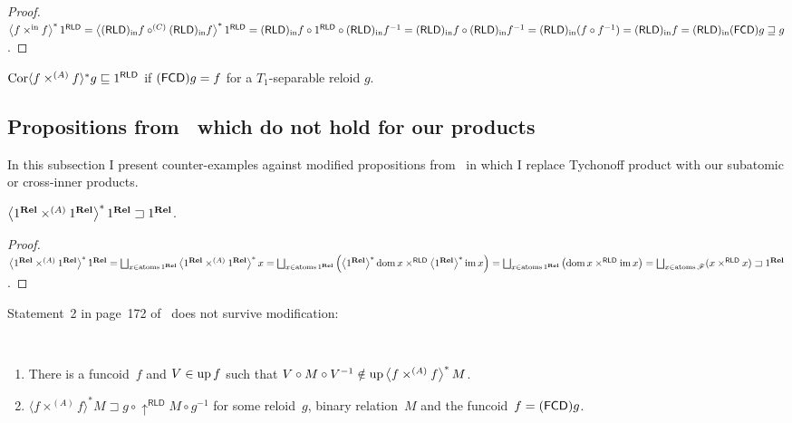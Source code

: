 \begin{proof}
$\left\langle f \times^{\mathrm{in}} f\right\rangle ^{\ast} 1^{\mathsf{RLD}} =
\left\langle (\mathsf{RLD})_{\mathrm{in}} f\circ^{(C)}(\mathsf{RLD})_{\mathrm{in}} f\right\rangle ^{\ast} 1^{\mathsf{RLD}} =
(\mathsf{RLD})_{\mathrm{in}} f\circ 1^{\mathsf{RLD}} \circ (\mathsf{RLD})_{\mathrm{in}} f^{-1} = 
(\mathsf{RLD})_{\mathrm{in}} f\circ (\mathsf{RLD})_{\mathrm{in}} f^{-1} = 
(\mathsf{RLD})_{\mathrm{in}} (f\circ f^{-1}) = (\mathsf{RLD})_{\mathrm{in}} f = (\mathsf{RLD})_{\mathrm{in}}(\mathsf{FCD}) g \sqsupseteq g$.
\end{proof}

\begin{lem}
  $\operatorname{Cor} \langle f \times^{(A)} f \rangle^{\ast} g \sqsubseteq 1^{\mathsf{RLD}}$ if
  $(\mathsf{FCD}) g = f$ for a $T_1$-separable reloid $g$.
\end{lem}

\subsection{Propositions from~\cite{bourb-top-1} which do not hold for our products}

In this subsection I present counter-examples against modified propositions from~\cite{bourb-top-1}
in which I replace Tychonoff product with our subatomic or cross-inner products.

\begin{example}
$\left\langle 1^{\mathbf{Rel}} \times^{(A)} 1^{\mathbf{Rel}}\right\rangle ^{\ast} 1^{\mathbf{Rel}} \sqsupset 1^{\mathbf{Rel}}$.
\end{example}

\begin{proof}
$\rsupfun{1^{\mathbf{Rel}} \times^{(A)} 1^{\mathbf{Rel}}} 1^{\mathbf{Rel}} =
\bigsqcup_{x\in\atoms 1^{\mathbf{Rel}}} \rsupfun{1^{\mathbf{Rel}} \times^{(A)} 1^{\mathbf{Rel}}} x =
\bigsqcup_{x\in\atoms 1^{\mathbf{Rel}}} \left( \rsupfun{1^{\mathbf{Rel}}} \dom x \times^{\mathsf{RLD}} \rsupfun{1^{\mathbf{Rel}}} \im x \right) =
\bigsqcup_{x\in\atoms 1^{\mathbf{Rel}}} \left( \dom x \times^{\mathsf{RLD}} \im x \right) =
\bigsqcup_{x\in\atoms \mathscr{F}} ( x \times^{\mathsf{RLD}} x ) \sqsupset
1^{\mathbf{Rel}}$.
\end{proof}

Statement~2 in page~172 of~\cite{bourb-top-1} does not survive modification:

\begin{example}
  ~
  \begin{enumerate}
    \item\label{vmv} There is a funcoid~$f$ and $V \in \operatorname{up} f$ such that
      $V \circ M \circ V^{- 1} \notin \operatorname{up} \left\langle f
      \times^{(A)} f \right\rangle ^{\ast} M$.
    \item\label{ffm} $\langle f \times^{(A)} f \rangle^{\ast} M \sqsupset g \circ
      \uparrow^{\mathsf{RLD}} M \circ g^{- 1}$ for some reloid~$g$, binary relation~$M$ and
      the funcoid~$f=(\mathsf{FCD}) g$.
  \end{enumerate}
\end{example}

